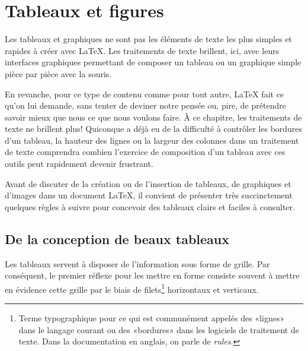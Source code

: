 
\chapter{Tableaux et figures}
\label{chap:tableaux}

Les tableaux et graphiques ne sont pas les éléments de texte les plus
simples et rapides à créer avec {\LaTeX}. Les traitements de texte
brillent, ici, avec leurs interfaces graphiques permettant de composer
un tableau ou un graphique simple pièce par pièce avec la souris.

En revanche, pour ce type de contenu comme pour tout autre, {\LaTeX}
fait ce qu'on lui demande, sans tenter de deviner notre pensée ou,
pire, de prétendre savoir mieux que nous ce que nous voulons faire. À
ce chapitre, les traitements de texte ne brillent plus! Quiconque a
déjà eu de la difficulté à contrôler les bordures d'un tableau, la
hauteur des lignes ou la largeur des colonnes dans un traitement de
texte comprendra combien l'exercice de composition d'un tableau avec
ces outils peut rapidement devenir frustrant.

Avant de discuter de la création ou de l'insertion de tableaux, de
graphiques et d'images dans un document {\LaTeX}, il convient de
présenter très succinctement quelques règles à suivre pour concevoir
des tableaux clairs et faciles à consulter.


\section{De la conception de beaux tableaux}
\label{sec:tableaux:booktabs}

Les tableaux servent à disposer de l'information sous forme de
grille. Par conséquent, le premier réflexe pour les mettre en forme
consiste souvent à mettre en évidence cette grille par le biais de
filets\footnote{%
  Terme typographique pour ce qui est communément appelés des «lignes»
  dans le langage courant ou des «bordures» dans les logiciels de
  traitement de texte. Dans la documentation en anglais, on parle de
  \emph{rules}.} %
horizontaux et verticaux.

